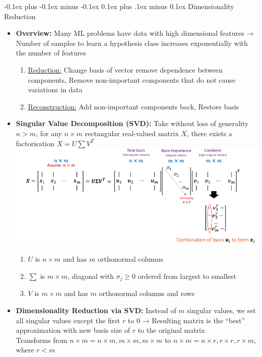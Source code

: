 \documentclass[landscape]{article}
\makeatletter
\renewcommand{\subsection}{\@startsection{subsection}{2}{0mm}%
  {-0.1ex plus -0.1ex minus -0.1ex}%
  {0.1ex plus .1ex minus 0.1ex}%
{\normalfont\scriptsize\bfseries}}
\makeatother
\begin{document}
\begin{multicols*}{5}
        \subsection{Dimensionality Reduction}
        \begin{itemize}
          \item \textbf{Overview:} Many ML problems have data with high dimensional features → Number of samples to learn a hypothesis class increases exponentially with the number of features
          \begin{enumerate}
            \item \underline{Reduction:} Change basis of vector remove dependence between components, Remove non-important components that do not cause variations in data
            \item \underline{Reconstruction:} Add non-important components back, Restore basis
          \end{enumerate}
          \item \textbf{Singular Value Decomposition (SVD):} Take without loss of generality $n > m$, for any $n \times m$ rectangular real-valued matrix $X$, there exists a factorisation $X = U\sum V^T$
          \includegraphics[width=0.95\linewidth]{29_SVD.png}
          \begin{enumerate}
            \item $U$ is $n \times m$ and has $m$ orthonormal columns
            \item $\sum$ is $m \times m$, diagonal with $\sigma_j \geq 0$ ordered from largest to smallest
            \item $V$ is $m \times m$ and has $m$ orthonormal columns and rows
          \end{enumerate}
          \item \textbf{Dimensionality Reduction via SVD:} Instead of $m$ singular values, we set all singular values except the first $r$ to 0 → Resulting matrix is the “best” approximation with new basis size of $r$ to the original matrix \\ Transforms from $n \times m = n \times m, m \times m, m \times m$ to $n \times m = n \times r, r \times r, r \times m$, where $r < m$

\end{itemize}
\end{multicols*}
\end{document}
